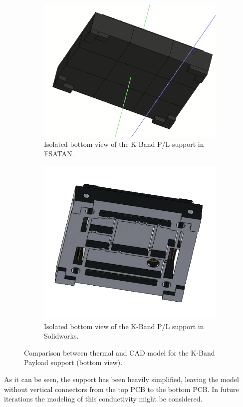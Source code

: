 \begin{figure}[H]
  \centering
  \begin{subfigure}{.5\textwidth}
    \centering
    \includegraphics[width=.6\linewidth]{res/img/5_simulationanalisys/Comparisons/ESATAN/kbandsupp_Bot.PNG}
    \caption{Isolated bottom view of the K-Band P/L support in ESATAN.}
    \label{fig:kbandsupportbot}
  \end{subfigure}%
  \begin{subfigure}{.5\textwidth}
    \centering
    \includegraphics[width=.5\linewidth]{res/img/5_simulationanalisys/Comparisons/SLDW/kbandsuppbot_solid.PNG}
    \caption{Isolated bottom view of the K-Band P/L support in Solidworks.}
    \label{fig:kbandsupportbotsolid}
  \end{subfigure}
  \caption{Comparison between thermal and CAD model for the K-Band Payload support (bottom view).}
  \label{fig:kbandsupportsolidbotim}
\end{figure}

As it can be seen, the support has been heavily simplified, leaving the model without vertical connectors
from the top PCB to the bottom PCB. In future iterations the modeling of this conductivity might be considered.

\paragraph{}

